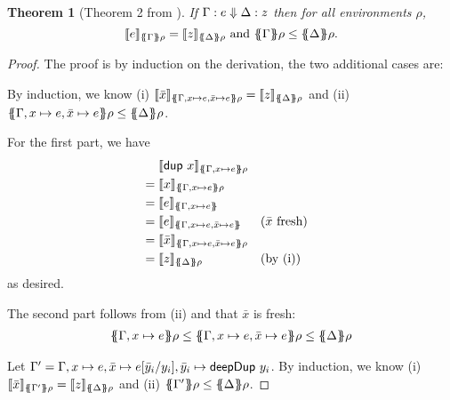 \documentclass[preprint]{sigplanconf}
\newtheorem{theorem}{Theorem}
\theoremstyle{nonumberplain}
\newtheorem{proof}{Proof}
\begin{document}
\begin{theorem}[Theorem 2 from \citep{launchbury}]
If $\Gamma : e \Downarrow \Delta : z$ then for all environments $\rho$,
\[
\dsem e {\esem \Gamma \rho} = \dsem z {\esem \Delta \rho}
\text{ and }
\esem \Gamma \rho \le \esem \Delta \rho.
\]
\end{theorem}
\begin{proof}
The proof is by induction on the derivation, the two additional cases are:

By induction, we know (i) $\dsem{\bar x}{\esem{\Gamma, x \mapsto e, \bar x \mapsto e} \rho} = \dsem{z}{\esem \Delta \rho}$ and (ii) $\esem{\Gamma, x \mapsto e, \bar x \mapsto e} \rho \le \esem \Delta \rho$.

For the first part, we have 
\begin{align*}
&\phantom{{}={}}\dsem{\sDup x}{\esem{\Gamma, x\mapsto e}\rho}\\
&= \dsem{x}{\esem{\Gamma, x\mapsto e}\rho}\\
&= \dsem{e}{\esem{\Gamma, x\mapsto e}}\\
&= \dsem{e}{\esem{\Gamma, x\mapsto e, \bar x \mapsto e}} && \text{($\bar x$ fresh)}\\
&= \dsem{\bar x}{\esem{\Gamma, x\mapsto e, \bar x \mapsto e}\rho} \\
&= \dsem{z}{\esem \Delta \rho} &&\text{(by (i))}
\end{align*}
as desired.

The second part follows from (ii) and that $\bar x$ is fresh:
\begin{align*}
\esem{\Gamma, x\mapsto e}\rho \le \esem{\Gamma, x\mapsto e, \bar x\mapsto e} \rho \le \esem{\Delta}\rho
\end{align*}

Let \mbox{$\Gamma' = \Gamma, x\mapsto e, \bar x\mapsto e[\bar y_i/y_i], \bar y_i \mapsto \text{\textsf{deepDup}}\ y_i$}.
By induction, we know (i) $\dsem{\bar x}{\esem{\Gamma'} \rho} = \dsem{z}{\esem \Delta \rho}$ and (ii) $\esem{\Gamma'} \rho \le \esem \Delta \rho$.


\end{proof}
\end{document}

